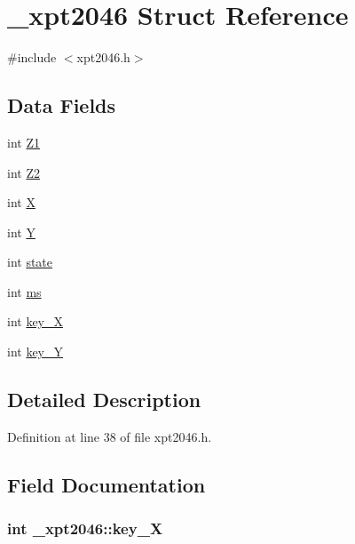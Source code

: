 \hypertarget{struct__xpt2046}{}\section{\+\_\+xpt2046 Struct Reference}
\label{struct__xpt2046}


{\ttfamily \#include $<$xpt2046.\+h$>$}

\subsection*{Data Fields}
\begin{DoxyCompactItemize}
\item 
int \hyperlink{struct__xpt2046_a3d4ffe11b35c91513c5c90b0b1d59f44}{Z1}
\item 
int \hyperlink{struct__xpt2046_af0cfbd929b6b3ae00d926aed6bd2dbcf}{Z2}
\item 
int \hyperlink{struct__xpt2046_a0ec6de4636a5f747e363186ff347039f}{X}
\item 
int \hyperlink{struct__xpt2046_a246ecf319439bdb35f405238c93a0868}{Y}
\item 
int \hyperlink{struct__xpt2046_a271e59b1fe899e8d1199f617bd381b15}{state}
\item 
int \hyperlink{struct__xpt2046_a7ada38c703d34310580fbdb4625a5190}{ms}
\item 
int \hyperlink{struct__xpt2046_a81e5a4f3575fdd96688f9a9614b9c593}{key\+\_\+X}
\item 
int \hyperlink{struct__xpt2046_af232621c9dbc271e0829d2be96862596}{key\+\_\+Y}
\end{DoxyCompactItemize}


\subsection{Detailed Description}


Definition at line 38 of file xpt2046.\+h.



\subsection{Field Documentation}
\subsubsection[{\texorpdfstring{key\+\_\+X}{key_X}}]{\setlength{\rightskip}{0pt plus 5cm}int \+\_\+xpt2046\+::key\+\_\+X}\hypertarget{struct__xpt2046_a81e5a4f3575fdd96688f9a9614b9c593}{}\label{struct__xpt2046_a81e5a4f3575fdd96688f9a9614b9c593}


